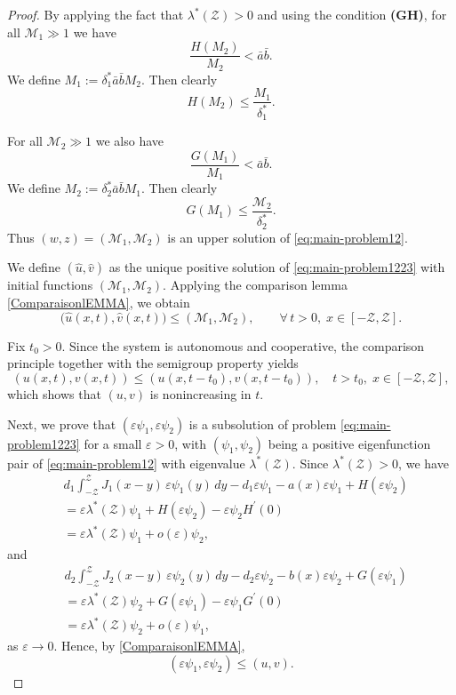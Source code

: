 \documentclass[a4paper,11pt]{amsart}
\theoremstyle{definition}
\numberwithin{equation}{section}
\theoremstyle{definition}
\begin{document}
\begin{proof}

By applying the fact that $\lambda^\ast (\mathcal{Z}) > 0$
and using the condition \textbf{(GH)}, for all $\mathcal{M}_1 \gg 1$ we have
\[
\frac{H(M_2)}{M_2} < \bar{a}\bar{b}.
\]
We define $M_1 := \delta^\ast_1 \bar{a}\bar{b} M_2$. Then clearly
\[
H(M_2) \leq \frac{M_1}{\delta_1^\ast}.
\]

For all $\mathcal{M}_2 \gg 1$ we also have
\[
\frac{G(M_1)}{M_1} < \bar{a}\bar{b}.
\]
We define $M_2 := \delta^\ast_2 \bar{a}\bar{b} M_1$. Then clearly
\[
G(M_1) \leq \frac{\mathcal{M}_2}{\delta^\ast_2}.
\]
Thus $(w,z) = (\mathcal{M}_1, \mathcal{M}_2)$ is an upper solution of \eqref{eq:main-problem12}.

We define $(\hat{u}, \hat{v})$ as the unique positive solution of \eqref{eq:main-problem1223} with initial functions $(\mathcal{M}_1,\mathcal{M}_2)$.
Applying the comparison lemma \eqref{ComparaisonlEMMA}, we obtain
\[
\bigl(\hat{u}(x,t), \hat{v}(x,t)\bigr) \leq (\mathcal{M}_1, \mathcal{M}_2),
\qquad \forall\, t > 0,\; x \in [-\mathcal{Z}, \mathcal{Z}].
\]

Fix $t_0>0$. Since the system is autonomous and cooperative, the comparison principle together with the semigroup property yields
\[
(u(x,t), v(x,t)) \leq (u(x,t-t_0), v(x,t-t_0)), \quad t>t_0,\; x\in[-\mathcal{Z},\mathcal{Z}],
\]
which shows that $(u,v)$ is nonincreasing in $t$.

Next, we prove that $(\varepsilon \psi_1, \varepsilon \psi_2)$ is a subsolution of problem \eqref{eq:main-problem1223} for a small $\varepsilon > 0$, with $(\psi_1, \psi_2)$ being a positive eigenfunction pair of \eqref{eq:main-problem12} with eigenvalue $\lambda^\ast(\mathcal{Z})$.
Since $\lambda^\ast(\mathcal{Z}) > 0$, we have
\begin{align*}
& d_1 \int_{-\mathcal{Z}}^{\mathcal{Z}} J_1(x-y)\,\varepsilon \psi_1(y)\,dy
- d_1 \varepsilon \psi_1
- a(x)\varepsilon \psi_1
+ H(\varepsilon \psi_2) \\
&= \varepsilon \lambda^\ast(\mathcal{Z})\psi_1+ H(\varepsilon \psi_2) - \varepsilon \psi_2 H^\prime(0) \\
&= \varepsilon \lambda^\ast(\mathcal{Z})\psi_1  + o(\varepsilon) \psi_2,
\end{align*}
and
\begin{align*}
& d_2 \int_{-\mathcal{Z}}^{\mathcal{Z}} J_2(x-y)\,\varepsilon \psi_2(y)\,dy
- d_2 \varepsilon \psi_2
- b(x)\varepsilon \psi_2 + G(\varepsilon \psi_1) \\
&= \varepsilon \lambda^\ast(\mathcal{Z})\psi_2 + G(\varepsilon \psi_1) - \varepsilon \psi_1 G^\prime(0) \\
&=  \varepsilon \lambda^\ast(\mathcal{Z})\psi_2  + o(\varepsilon) \psi_1,
\end{align*}
as $\varepsilon \to 0$. Hence, by \eqref{ComparaisonlEMMA},
\[
(\varepsilon \psi_1, \varepsilon \psi_2) \leq (u, v).
\]


\end{proof}
\end{document}
